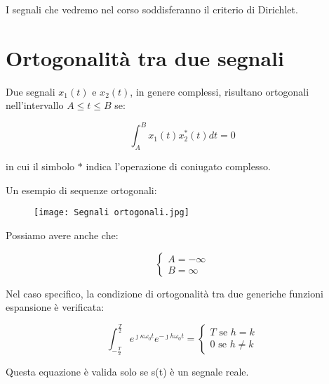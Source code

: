 I segnali che vedremo nel corso soddisferanno il criterio di Dirichlet. \newline  

\newpage    

\section{Ortogonalità tra due segnali} 

Due segnali $x_1 (t)$ e $x_2 (t)$, in genere complessi, risultano ortogonali 
nell'intervallo $A \le t \le B$ se: 

{
    \Large 
    \begin{equation}
        \int_{A}^{B} 
        x_1 (t) x_2 ^{*} (t) dt = 0 
    \end{equation}
}

in cui il simbolo $*$ indica l'operazione di coniugato complesso. \newline 

Un esempio di sequenze ortogonali: 

\begin{figure}[h]
    \centering
    \texttt{[image: Segnali ortogonali.jpg]}
\end{figure}  

Possiamo avere anche che: 

{
    \Large 
    \begin{equation}
        \begin{cases}
            A = -\infty \\
            B = \infty
        \end{cases} 
    \end{equation}
} 

Nel caso specifico, la condizione di ortogonalità tra due generiche funzioni espansione 
è verificata: 

{
    \Large 
    \begin{equation}
        \int_{-\frac{T}{2}}^{\frac{T}{2}} 
        e^{\jmath \kappa \omega_0 t} e^{-\jmath h \omega_0 t} 
        = 
        \begin{cases}
            T \text{    se  } h = k\\ 
            0 \text{    se  } h \neq k 
        \end{cases}
    \end{equation}
}

Questa equazione è valida solo se s(t) è un segnale reale. \newline 

